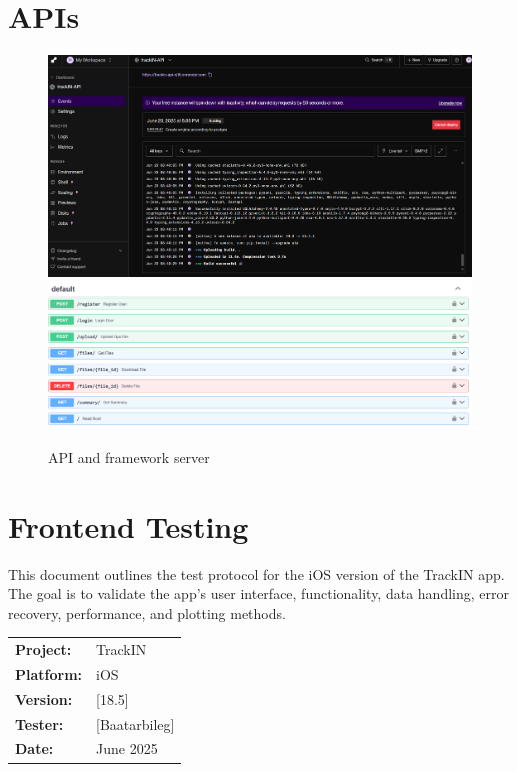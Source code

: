 \documentclass[12pt]{article}
\begin{document}
\section{APIs}
\begin{figure}[h!]
    \centering
    \includegraphics[width=\textwidth]{Project_Screenshots/API.png}
    \includegraphics[width=\textwidth]{Project_Screenshots/API2.png}
    \caption{API and framework server }
\end{figure}


\section{Frontend Testing}
\newpage
This document outlines the test protocol for the iOS version of the TrackIN app. The goal is to validate the app’s user interface, functionality, data handling, error recovery, performance, and plotting methods.

\begin{tabular}{ll}
\textbf{Project:} & TrackIN \\
\textbf{Platform:} & iOS \\
\textbf{Version:} & [18.5] \\
\textbf{Tester:} & [Baatarbileg] \\
\textbf{Date:} & June 2025 \\
\end{tabular}
\end{document}
